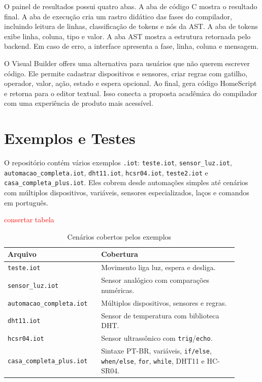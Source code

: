 \documentclass[conference]{IEEEtran}
\begin{document}
O painel de resultados possui quatro abas. A aba de código C mostra o resultado final. A aba de execução cria um rastro didático das fases do compilador, incluindo leitura de linhas, classificação de tokens e nós da AST. A aba de tokens exibe linha, coluna, tipo e valor. A aba AST mostra a estrutura retornada pelo backend. Em caso de erro, a interface apresenta a fase, linha, coluna e mensagem.

O Visual Builder offers uma alternativa para usuários que não querem escrever código. Ele permite cadastrar dispositivos e sensores, criar regras com gatilho, operador, valor, ação, estado e espera opcional. Ao final, gera código HomeScript e retorna para o editor textual. Isso conecta a proposta acadêmica do compilador com uma experiência de produto mais acessível.

\section{Exemplos e Testes}
O repositório contém vários exemplos \texttt{.iot}: \texttt{teste.iot}, \texttt{sensor\_luz.iot}, \texttt{automacao\_completa.iot}, \texttt{dht11.iot}, \texttt{hcsr04.iot}, \texttt{teste2.iot} e \texttt{casa\_completa\_plus.iot}. Eles cobrem desde automações simples até cenários com múltiplos dispositivos, variáveis, sensores especializados, laços e comandos em português.


\textcolor{red}{consertar tabela}
\begin{table}[htbp]
\caption{Cenários cobertos pelos exemplos}
\label{tab:exemplos}
\centering
\begin{tabular}{p{0.35\linewidth}p{0.55\linewidth}}
\toprule
\textbf{Arquivo} & \textbf{Cobertura} \\
\midrule
\texttt{teste.iot} & Movimento liga luz, espera e desliga. \\
\texttt{sensor\_luz.iot} & Sensor analógico com comparações numéricas. \\
\texttt{automacao\_completa.iot} & Múltiplos dispositivos, sensores e regras. \\
\texttt{dht11.iot} & Sensor de temperatura com biblioteca DHT. \\
\texttt{hcsr04.iot} & Sensor ultrassônico com \texttt{trig}/\texttt{echo}. \\
\texttt{casa\_completa\_plus.iot} & Sintaxe PT-BR, variáveis, \texttt{if/else}, \texttt{when/else}, \texttt{for}, \texttt{while}, DHT11 e HC-SR04. \\
\bottomrule
\end{tabular}
\end{table}
\end{document}
